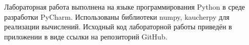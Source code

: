 \documentclass[../body.tex]{subfiles}
\begin{document}
	Лабораторная работа выполнена на языке программирования Python в среде разработки PyCharm. Использованы библиотеки  numpy, kaucherpy для реализации вычислений. 
	Исходный код лабораторной работы приведён в приложении в виде ссылки на репозиторий GitHub.
\end{document}
